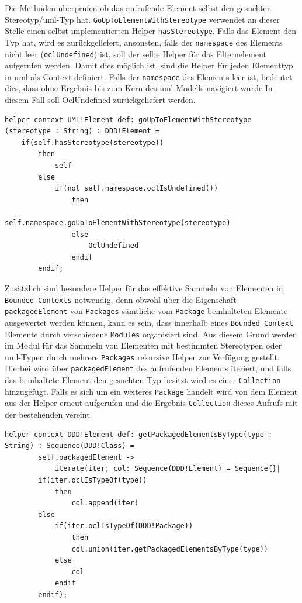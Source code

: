 \documentclass[
	oneside,  %
	ngerman, 
	final, 
	11pt, 
	a4paper, 
	1.1headlines, 
	headinclude=false, 
	footinclude=false, 
	mpinclude=false, 
	pagesize, 
	onecolumn, 
	titlepage, 
	parskip=half, 
	headsepline, 
	chapterprefix=false, 
	version=first, 
	listof=totoc, 
	bibliography=totoc, 
	toc=graduated, 
	fleqn
]{scrbook}
\begin{document}
 Die Methoden überprüfen ob das aufrufende Element selbst den gesuchten Stereotyp/\ac{uml}-Typ hat. \texttt{GoUpToElementWithStereotype} verwendet an dieser Stelle einen selbst implementierten Helper \texttt{hasStereotype}. Falls das Element den Typ hat, wird es zurückgeliefert, ansonsten, falls der \texttt{namespace} des Elements nicht leer (\texttt{oclUndefined}) ist, soll der selbe Helper für das Elternelement aufgerufen werden. Damit dies möglich ist, sind die Helper für jeden Elementtyp in \ac{uml} als Context definiert. Falls der \texttt{namespace} des Elements leer ist, bedeutet dies, dass ohne Ergebnis bis zum Kern des \ac{uml} Modells navigiert wurde In diesem Fall soll OclUndefined zurückgeliefert werden.
\begin{lstlisting}[caption={Helper zur rekursiven Suche nach Elternelementen},captionpos=b,label=Quellcode:GoUpToElementWithStereotype] 
helper context UML!Element def: goUpToElementWithStereotype (stereotype : String) : DDD!Element =
	if(self.hasStereotype(stereotype))
		then
			self
		else
			if(not self.namespace.oclIsUndefined())
				then
					self.namespace.goUpToElementWithStereotype(stereotype)
				else
					OclUndefined
				endif
		endif;
\end{lstlisting}
Zusätzlich sind besondere Helper für das effektive Sammeln von Elementen in \texttt{Bounded Contexts} notwendig, denn obwohl über die Eigenschaft \texttt{packagedElement} von \texttt{Packages} sämtliche vom \texttt{Package} beinhalteten Elemente ausgewertet werden können, kann es sein, dass innerhalb eines \texttt{Bounded Context} Elemente durch verschiedene \texttt{Modules} organisiert sind. Aus diesem Grund werden im Modul für das Sammeln von Elementen mit bestimmten Stereotypen oder \ac{uml}-Typen durch mehrere \texttt{Packages} rekursive Helper zur Verfügung gestellt. Hierbei wird über \texttt{packagedElement} des aufrufenden Elements iteriert, und falls das beinhaltete Element den gesuchten Typ besitzt wird es einer \texttt{Collection} hinzugefügt. Falls es sich um ein weiteres \texttt{Package} handelt wird von dem Element aus der Helper erneut aufgerufen und die Ergebnis \texttt{Collection} dieses Aufrufs mit der bestehenden vereint.
\begin{lstlisting}[caption={Helper zur rekursiven Suche nach Kindelementen},captionpos=b,label=Quellcode:getPackagedELementsByType] 
helper context DDD!Element def: getPackagedElementsByType(type : String) : Sequence(DDD!Class) =
		self.packagedElement ->
			iterate(iter; col: Sequence(DDD!Element) = Sequence{}|
		if(iter.oclIsTypeOf(type))
			then
				col.append(iter)
		else
			if(iter.oclIsTypeOf(DDD!Package))
				then
				col.union(iter.getPackagedElementsByType(type))
			else
				col
			endif
		endif);
\end{lstlisting}
\end{document}

